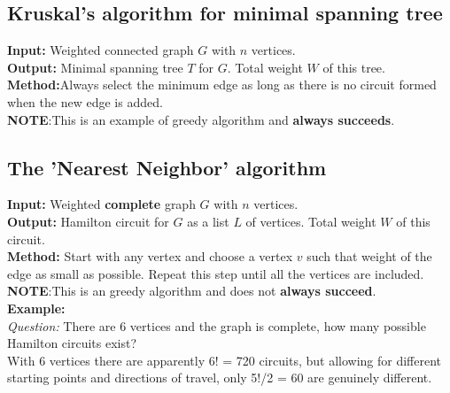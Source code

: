 \documentclass{article}
\begin{document}
\begin{spacing}{1.5}
\subsection{Kruskal's algorithm for minimal spanning tree}
\textbf{Input:} Weighted connected graph $G$ with $n$ vertices.\\
\textbf{Output:} Minimal spanning tree $T$ for $G$. Total weight $W$ of this tree. \\
\textbf{Method:}Always select the minimum edge as long as there is no circuit formed when the new edge is added.\\ 
\textbf{NOTE}:This is an example of greedy algorithm and \textbf{always succeeds}. 

\subsection{The 'Nearest Neighbor' algorithm}
\textbf{Input:} Weighted \textbf{complete} graph $G$ with $n$ vertices.\\
\textbf{Output:} Hamilton circuit for $G$ as a list $L$ of vertices. Total weight $W$ of this circuit. \\
\textbf{Method:} Start with any vertex and choose a vertex $v$ such that weight of the edge as small as possible. Repeat this step until all the vertices are included.\\
\textbf{NOTE}:This is an greedy algorithm and does not \textbf{always succeed}. \\
\textbf{Example:}\\
\textit{Question: }There are 6 vertices and the graph is complete, how many possible Hamilton circuits exist?\\
With 6 vertices there are apparently 6! = 720 circuits, but allowing for different starting points and directions of travel, only 5!/2 = 60 are genuinely different.



\end{spacing}
\end{document}
